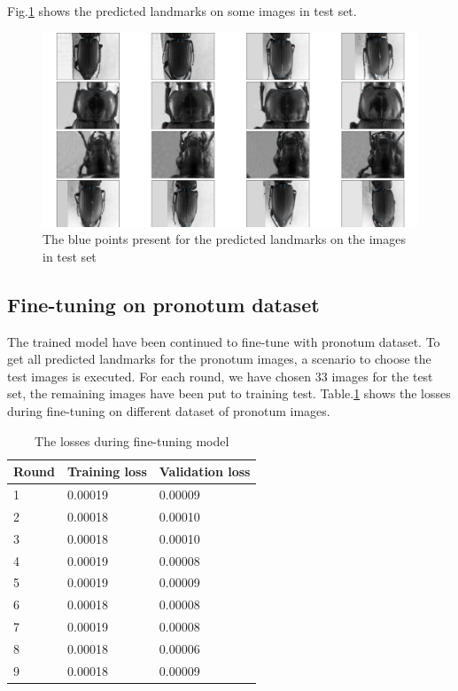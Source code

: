 \documentclass[12pt,a4paper]{article}
\begin{document}
Fig.\ref{figtestallparts} shows the predicted landmarks on some images in test set.
\begin{figure}[h!]
	\centering
	\includegraphics[scale=0.53]{images/all_parts_10000epochs_test}
	\caption{The blue points present for the predicted landmarks on the images in test set}
	\label{figtestallparts}
\end{figure}
\subsection{Fine-tuning on pronotum dataset}
The trained model have been continued to fine-tune \cite{yosinski2014transferable} with pronotum dataset. To get all predicted landmarks for the pronotum images, a scenario to choose the test images is executed. For each round, we have chosen 33 images for the test set, the remaining images have been put to training test. Table.\ref{finetuningloss} shows the losses during fine-tuning on different dataset of pronotum images.

\begin{table}[h!]
	\centering
	\begin{tabular}{l l l}
	Round & Training loss & Validation loss \\ \hline
	1 & 0.00019 & 0.00009  \\ \hline
	2 & 0.00018 & 0.00010 \\ \hline
	3 & 0.00018 & 0.00010 \\ \hline
	4 & 0.00019 & 0.00008 \\ \hline
	5 & 0.00019 & 0.00009 \\ \hline
	6 & 0.00018 & 0.00008 \\ \hline
	7 & 0.00019 & 0.00008 \\ \hline
	8 & 0.00018 & 0.00006 \\ \hline
	9 & 0.00018 & 0.00009 \\ \hline
	\end{tabular}
	\caption{The losses during fine-tuning model}
	\label{finetuningloss}
\end{table}
\end{document}
